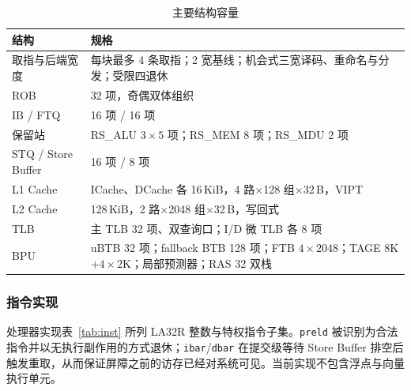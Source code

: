 \begin{table}[H]
\centering
\caption{主要结构容量}
\label{tab:capacity}
\small
\begin{tabularx}{\textwidth}{>{\raggedright\arraybackslash}p{3.3cm}X}
\toprule
结构 & 规格 \\
\midrule
取指与后端宽度 & 每块最多 4 条取指；2 宽基线；机会式三宽译码、重命名与分发；受限四退休 \\
ROB & 32 项，奇偶双体组织 \\
IB / FTQ & 16 项 / 16 项 \\
保留站 & RS\_ALU $3\times5$ 项；RS\_MEM 8 项；RS\_MDU 2 项 \\
STQ / Store Buffer & 16 项 / 8 项 \\
L1 Cache & ICache、DCache 各 16\,KiB，4 路$\times$128 组$\times$32\,B，VIPT \\
L2 Cache & 128\,KiB，2 路$\times$2048 组$\times$32\,B，写回式 \\
TLB & 主 TLB 32 项、双查询口；I/D 微 TLB 各 8 项 \\
BPU & uBTB 32 项；fallback BTB 128 项；FTB $4\times2048$；TAGE 8K$+4\times2$K；局部预测器；RAS 32 双栈 \\
\bottomrule
\end{tabularx}
\end{table}

\subsubsection{指令实现}

处理器实现表~\ref{tab:inst} 所列 LA32R 整数与特权指令子集。\texttt{preld} 被识别为合法指令并以无执行副作用的方式退休；\texttt{ibar}/\texttt{dbar} 在提交级等待 Store Buffer 排空后触发重取，从而保证屏障之前的访存已经对系统可见。当前实现不包含浮点与向量执行单元。

